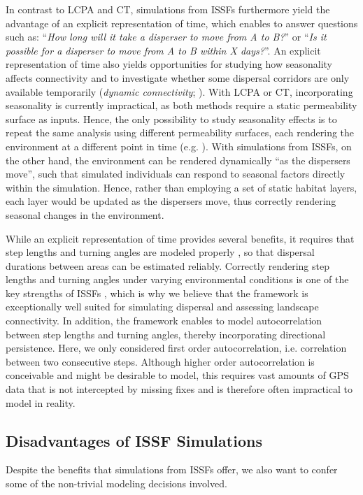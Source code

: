 \documentclass[abstract=on,10pt,a4paper,bibliography=totocnumbered]{article}
\begin{document}
In contrast to LCPA and CT, simulations from ISSFs furthermore yield the
advantage of an explicit representation of time, which enables to answer
questions such as: ``\textit{How long will it take a disperser to move from A to
B?}'' or ``\textit{Is it possible for a disperser to move from A to B within X
days?}''. An explicit representation of time also yields opportunities
for studying how seasonality affects connectivity and to investigate whether
some dispersal corridors are only available temporarily (\textit{dynamic
connectivity}; \citealp{Zeller.2020}). With LCPA or CT, incorporating
seasonality is currently impractical, as both methods require a static
permeability surface as inputs. Hence, the only possibility to study seasonality
effects is to repeat the same analysis using different permeability surfaces,
each rendering the environment at a different point in time (e.g.
\citealp{Benz.2016, Osipova.2019}). With simulations from ISSFs, on the other
hand, the environment can be rendered dynamically ``as the dispersers move'',
such that simulated individuals can respond to seasonal factors directly within
the simulation. Hence, rather than employing a set of static habitat layers,
each layer would be updated as the dispersers move, thus correctly rendering
seasonal changes in the environment.

While an explicit representation of time provides several benefits, it requires
that step lengths and turning angles are modeled properly
\citep{Kanagaraj.2013}, so that dispersal durations between areas can be
estimated reliably. Correctly rendering step lengths and turning angles under
varying environmental conditions is one of the key strengths of ISSFs
\citep{Avgar.2016, Prokopenko.2017, Fieberg.2021}, which is why we believe that
the framework is exceptionally well suited for simulating dispersal and
assessing landscape connectivity. In addition, the framework enables to model
autocorrelation between step lengths and turning angles, thereby incorporating
directional persistence. Here, we only considered first order autocorrelation,
i.e. correlation between two consecutive steps. Although higher order
autocorrelation is conceivable and might be desirable to model, this requires
vast amounts of GPS data that is not intercepted by missing fixes and is
therefore often impractical to model in reality.

\subsection{Disadvantages of ISSF Simulations}
Despite the benefits that simulations from ISSFs offer, we also want to confer
some of the non-trivial modeling decisions involved.
\end{document}
